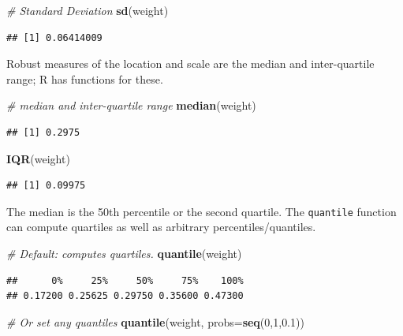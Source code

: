 \documentclass[]{book}
\newenvironment{Shaded}{\begin{snugshade}}{\end{snugshade}}
\newcommand{\CommentTok}[1]{\textcolor[rgb]{0.56,0.35,0.01}{\textit{#1}}}
\newcommand{\DataTypeTok}[1]{\textcolor[rgb]{0.13,0.29,0.53}{#1}}
\newcommand{\DecValTok}[1]{\textcolor[rgb]{0.00,0.00,0.81}{#1}}
\newcommand{\FloatTok}[1]{\textcolor[rgb]{0.00,0.00,0.81}{#1}}
\newcommand{\KeywordTok}[1]{\textcolor[rgb]{0.13,0.29,0.53}{\textbf{#1}}}
\newcommand{\NormalTok}[1]{#1}
\begin{document}
\begin{Shaded}
\begin{Highlighting}[]
\CommentTok{# Standard Deviation}
\KeywordTok{sd}\NormalTok{(weight)}
\end{Highlighting}
\end{Shaded}

\begin{verbatim}
## [1] 0.06414009
\end{verbatim}

Robust measures of the location and scale are the median and inter-quartile range; R has functions for these.

\begin{Shaded}
\begin{Highlighting}[]
\CommentTok{# median and inter-quartile range}
\KeywordTok{median}\NormalTok{(weight)}
\end{Highlighting}
\end{Shaded}

\begin{verbatim}
## [1] 0.2975
\end{verbatim}

\begin{Shaded}
\begin{Highlighting}[]
\KeywordTok{IQR}\NormalTok{(weight)}
\end{Highlighting}
\end{Shaded}

\begin{verbatim}
## [1] 0.09975
\end{verbatim}

The median is the 50th percentile or the second quartile. The \texttt{quantile} function can compute quartiles as well as arbitrary percentiles/quantiles.

\begin{Shaded}
\begin{Highlighting}[]
\CommentTok{# Default: computes quartiles.}
\KeywordTok{quantile}\NormalTok{(weight)}
\end{Highlighting}
\end{Shaded}

\begin{verbatim}
##      0%     25%     50%     75%    100% 
## 0.17200 0.25625 0.29750 0.35600 0.47300
\end{verbatim}

\begin{Shaded}
\begin{Highlighting}[]
\CommentTok{# Or set any quantiles}
\KeywordTok{quantile}\NormalTok{(weight, }\DataTypeTok{probs=}\KeywordTok{seq}\NormalTok{(}\DecValTok{0}\NormalTok{,}\DecValTok{1}\NormalTok{,}\FloatTok{0.1}\NormalTok{))}
\end{Highlighting}
\end{Shaded}
\end{document}
